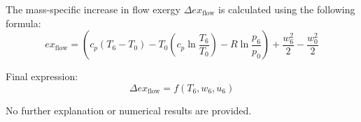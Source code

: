 The mass-specific increase in flow exergy \( \Delta ex_{\text{flow}} \) is calculated using the following formula:  
\[
ex_{\text{flow}} = (c_p(T_6 - T_0) - T_0(c_p \ln \frac{T_6}{T_0}) - R \ln \frac{p_6}{p_0}) + \frac{w_6^2}{2} - \frac{w_0^2}{2}
\]  

Final expression:  
\[
\Delta ex_{\text{flow}} = f(T_6, w_6, u_6)
\]  

No further explanation or numerical results are provided.